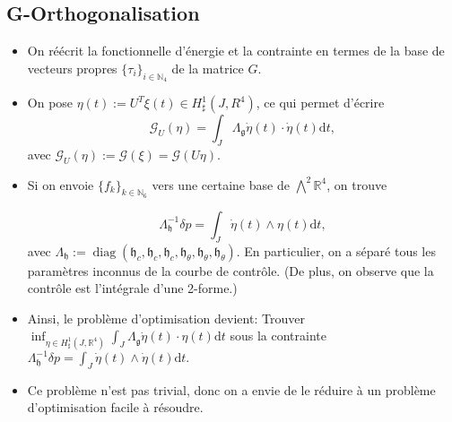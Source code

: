 \documentclass[12pt,a4paper]{article}
\theoremstyle{plain}
\theoremstyle{plain}
\theoremstyle{plain}
\theoremstyle{definition}
\theoremstyle{definition}
\theoremstyle{definition}
\theoremstyle{plain}
\newcommand{\N}{\mathbb{N}}
\newcommand{\R}{\mathbb{R}}
\DeclareMathOperator{\diag}{diag}
\newcommand{\dd}[1]{\mathrm{d}#1}
\begin{document}
\subsection{G-Orthogonalisation}
\begin{itemize}
\item On réécrit la fonctionnelle d'énergie et la contrainte en termes de la base de vecteurs propres $\{\tau_i\}_{i\in \N_4}$ de la matrice $G$.

\item On pose $\eta(t) := U^T \xi(t) \in H^1_{\sharp}(J, R^4)$, ce qui permet d'écrire
\begin{equation}
\label{eq: G-orth energy functional}
\mathcal{G}_{U}(\eta) = \int_{J} \Lambda_{\mathfrak{g}} \dot{\eta}(t) \cdot \dot{\eta}(t) \dd t,
\end{equation}
avec $\mathcal{G}_{U}(\eta) := \mathcal{G}(\xi) = \mathcal{G}(U \eta)$.

\item Si on envoie $\{f_k\}_{k \in \N_6}$ vers une certaine base de $\bigwedge^2 \R^4$, on trouve

%
%
\begin{equation}
\label{eq: G-orth constraint}
\Lambda_{\mathfrak{h}}^{-1} \delta p = \int_{J} \dot{\eta}(t) \wedge\eta(t) \dd t,
\end{equation}
avec $\Lambda_{\mathfrak{h}} := \diag(\mathfrak{h}_{c}, \mathfrak{h}_{c}, \mathfrak{h}_{c}, \mathfrak{h}_{\theta}, \mathfrak{h}_{\theta}, \mathfrak{h}_{\theta})$. En particulier, on a séparé tous les paramètres inconnus de la courbe de contrôle. (De plus, on observe que la contrôle est l'intégrale d'une 2-forme.)

\item Ainsi, le problème d'optimisation devient: Trouver $\inf_{\eta \in H^1_{\sharp}(J, \R^4)} \int_{J}\Lambda_{\mathfrak{g}} \dot{\eta}(t) \cdot \eta(t) \dd t $ sous la contrainte $\Lambda_{\mathfrak{h}}^{-1} \delta p = \int_{J} \dot{\eta}(t) \wedge\dot{\eta}(t) \dd t.$


\item Ce problème n'est pas trivial, donc on a envie de le réduire à un problème d'optimisation facile à résoudre.
\end{itemize}
\end{document}
